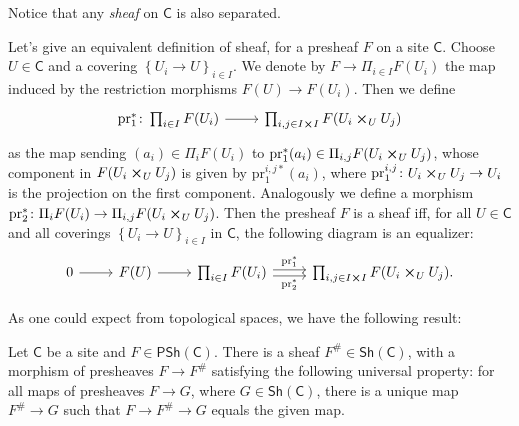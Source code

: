 \documentclass[../Main]{subfiles}
\begin{document}
\noindent
Notice that any {\em sheaf} on $\mathsf{C}$ is also separated.
\begin{rem}[]
	Let's give an equivalent definition of sheaf, for a presheaf
	$F$ on a site $\mathsf{C}$.
	Choose $U \in \mathsf{C}$ and a covering $\left\{ U_{ i } \to U \right\}_{ i \in I }$.
	We denote by $F \to \Pi_{i \in I} F(U_i)$ the map induced by the
	restriction morphisms $F(U) \to F(U_i)$.
	Then we define
	\begin{equation*}
	\begin{tikzcd}[row sep = 0ex
		,/tikz/column 1/.append style={anchor=base east}
		,/tikz/column 2/.append style={anchor=base west}]
		\mathrm{pr}_1^*\colon \prod_{i \in I} F(U_i) \arrow[r, "", rightarrow] &
		\prod_{i,j \in I \cross I} F( U_i \cross_{ U } U_j )
	\end{tikzcd}
	\end{equation*} 
	as the map sending $(a_i) \in \Pi_i F(U_i)$ to
	$\mathrm{pr}_1^*(a_i) \in \Pi_{i,j} F( U_i \cross_{ U } U_j )$,
	whose component in $F( U_i \cross_{ U } U_j )$ is given by $\mathrm{pr}_1^{i,j*}(a_i)$,
	where $\mathrm{pr}^{i,j}_1\colon U_i \cross_{ U } U_j \to U_i$ is the projection on the first
	component.
	Analogously we define a morphism $\mathrm{pr}_2^*\colon \Pi_i F(U_i) \to 
	\Pi_{i,j} F( U_i \cross_{ U } U_j )$.
	Then the presheaf $F$ is a sheaf iff, for all $U \in \mathsf{C}$ and all coverings
	$\left\{ U_{ i } \to U \right\}_{ i \in I }$ in $\mathsf{C}$,
	the following diagram is an equalizer:
	\begin{equation*}
	\begin{tikzcd}
		0 \arrow[r, "", rightarrow] &
		F(U) \arrow[r, "", rightarrow] &
		\prod_{i \in I} F(U_i) 
		\arrow[r, "\mathrm{pr}_1^*", rightarrow, shift left = 0.5ex] 
		\arrow[r, "\mathrm{pr}_2^*"', rightarrow, shift right = 0.5ex] &
		\prod_{i,j \in I \cross I} F( U_i \cross_{ U } U_j )
	.\end{tikzcd}
	\end{equation*}
\end{rem}


\noindent
As one could expect from topological spaces, we have the following result:
\begin{prop}
	Let $\mathsf{C}$ be a site and $F \in \mathsf{PSh}(\mathsf{C})$.
	There is a sheaf $F^\# \in \mathsf{Sh}(\mathsf{C})$, with a morphism of presheaves
	$F \to F^\#$ satisfying the following universal property:
	for all maps of presheaves $F \to G$, where $G \in \mathsf{Sh}\left(\mathsf{C}\right)$,
	there is a unique map $F^\# \to G$ such that $F \to F^\# \to G$
	equals the given map.
\end{prop}
\end{document}
